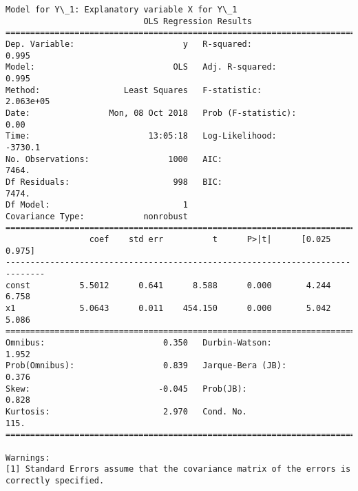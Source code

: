 \documentclass[11pt]{article}
\begin{document}
    \begin{Verbatim}[commandchars=\\\{\}]
Model for Y\_1: Explanatory variable X for Y\_1
                            OLS Regression Results                            
==============================================================================
Dep. Variable:                      y   R-squared:                       0.995
Model:                            OLS   Adj. R-squared:                  0.995
Method:                 Least Squares   F-statistic:                 2.063e+05
Date:                Mon, 08 Oct 2018   Prob (F-statistic):               0.00
Time:                        13:05:18   Log-Likelihood:                -3730.1
No. Observations:                1000   AIC:                             7464.
Df Residuals:                     998   BIC:                             7474.
Df Model:                           1                                         
Covariance Type:            nonrobust                                         
==============================================================================
                 coef    std err          t      P>|t|      [0.025      0.975]
------------------------------------------------------------------------------
const          5.5012      0.641      8.588      0.000       4.244       6.758
x1             5.0643      0.011    454.150      0.000       5.042       5.086
==============================================================================
Omnibus:                        0.350   Durbin-Watson:                   1.952
Prob(Omnibus):                  0.839   Jarque-Bera (JB):                0.376
Skew:                          -0.045   Prob(JB):                        0.828
Kurtosis:                       2.970   Cond. No.                         115.
==============================================================================

Warnings:
[1] Standard Errors assume that the covariance matrix of the errors is correctly specified.



\end{Verbatim}
\end{document}
